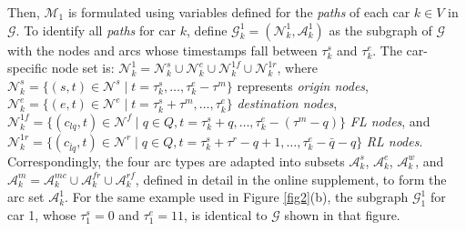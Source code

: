 \documentclass[12pt]{article}
\begin{document}
Then, $\mathcal{M}_1$ is formulated using variables defined for the \textit{paths} of each car $k\in V$ in $\mathcal{G}$. To identify all \textit{paths} for car $k$, define $\mathcal{G}^{1}_k=(\mathcal{N}^1_k,\mathcal{A}^1_k)$ as the subgraph of $\mathcal{G}$ with the nodes and arcs whose timestamps fall between $\tau^s_k$ and $\tau^e_k$. %
The car-specific node set is: $\mathcal{N}^1_k=\mathcal{N}^s_k\cup \mathcal{N}^e_k\cup \mathcal{N}^{1f}_k \cup \mathcal{N}^{1r}_k$, where $\mathcal{N}^s_k=\{(s,t)\in \mathcal{N}^s\mid t = \tau^s_k,\dots,\tau^e_k-\tau^m\}$ represents \textit{origin nodes}, $\mathcal{N}^e_k=\{(e,t)\in \mathcal{N}^e\mid t=\tau^s_k+\tau^m,\dots,\tau^e_k\}$ \textit{destination nodes}, $\mathcal{N}^{1f}_k=\{(c_{lq},t)\in \mathcal{N}^f\mid q\in Q, t=\tau^s_k+q,\dots,\tau^e_k-(\tau^m-q)\}$ \textit{FL nodes}, and $\mathcal{N}^{1r}_k=\{(c_{\bar{l}q},t)\in \mathcal{N}^r\mid q\in Q, t=\tau^s_k + \tau^r-q+1,\dots,\tau^e_k-\bar{q}-q\}$ \textit{RL nodes}. Correspondingly, the four arc types are adapted into subsets $\mathcal{A}^s_k$, $\mathcal{A}^e_k$, $\mathcal{A}^w_k$, and $\mathcal{A}^m_k=\mathcal{A}^{mc}_k\cup \mathcal{A}^{fr}_k\cup \mathcal{A}^{rf}_k$, defined in detail in the online supplement, to form the arc set $\mathcal{A}^1_k$. For the same example used in Figure \ref{fig2}(b), the subgraph $\mathcal{G}^1_1$ for car 1, whose $\tau^s_1=0$ and $\tau^e_1=11$, is identical to $\mathcal{G}$ shown in that figure.


\end{document}
